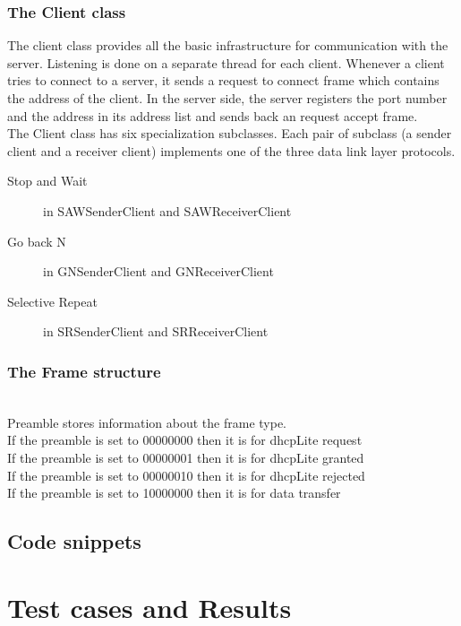 \documentclass[14pt,titlepage, a4paper]{extarticle}
\begin{document}
\subsubsection{The Client class}
The client class provides all the basic infrastructure
for communication with the server. Listening is done on a separate
thread for each client. Whenever a client tries to connect to a server,
it sends a request to connect frame which contains the address of the client.
In the server side, the server registers the port number and the address in its
address list and sends back an request accept frame.
\\
The Client class has six specialization subclasses.
Each pair of subclass (a sender client and a receiver client) implements
one of the three data link layer protocols.
\begin{description}
	\item [Stop and Wait] in  SAWSenderClient and SAWReceiverClient
	\item [Go back N] in GNSenderClient and GNReceiverClient
	\item [Selective Repeat] in SRSenderClient and SRReceiverClient
\end{description}


\subsubsection{The Frame structure}
\\
Preamble stores information about the frame type.\\
If the preamble is set to 00000000 then it is for dhcpLite request\\
If the preamble is set to 00000001 then it is for dhcpLite granted\\
If the preamble is set to 00000010 then it is for dhcpLite rejected\\
If the preamble is set to 10000000 then it is for data transfer
\subsection{Code snippets}

\section{Test cases and Results}
\end{document}

